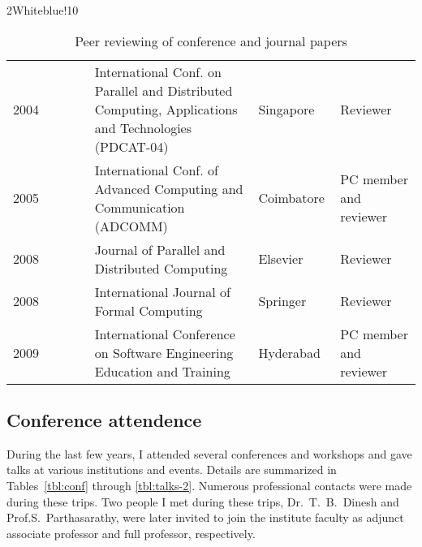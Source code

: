 \documentclass[titlepage, %
11pt, 
]{article}
\begin{document}
\begin{table}
\begin{minipage}{1.0\linewidth}
\rowcolors%
{2}{White}{blue!10}
\setlength\extrarowheight{4pt}
\begin{tabular}%
{|p{0.20\linewidth}|p{0.40\linewidth}|p{0.20\linewidth}|p{0.20\linewidth}|}
\hline
\multicolumn{1}{|m{0.20\linewidth}|}{\centering {\bf Year}}&
\multicolumn{1}{m{0.40\linewidth}|}{\centering {\bf Conference or Journal}}&
\multicolumn{1}{m{0.20\linewidth}|}{\centering {\bf Location or Publisher}}&
\multicolumn{1}{m{0.20\linewidth}|}{\centering {\bf Role}}\\
\hline
2004 & International Conf. on Parallel and Distributed Computing, Applications and Technologies (PDCAT-04) & Singapore & Reviewer\\
2005 & International Conf. of Advanced Computing and Communication (ADCOMM) & Coimbatore & PC member and reviewer\\
2008 & Journal of Parallel and Distributed Computing & Elsevier & Reviewer\\
2008 & International Journal of Formal Computing & Springer & Reviewer\\
2009 & International Conference on Software Engineering Education and Training& Hyderabad & PC member and reviewer\\
\hline
\end{tabular}
\end{minipage}
\caption{Peer reviewing of conference and journal papers\label{tbl:reviewer}}
\end{table}

\subsection{Conference attendence}
\label{subsec:conf-attendence}
During the last few years, I attended several conferences
and workshops and gave talks at various institutions and
events.  Details are summarized in Tables~\ref{tbl:conf}
through \ref{tbl:talks-2}.  Numerous professional contacts
were made during these trips.  Two people I met during these
trips, Dr.~T.~B.~Dinesh and Prof.S.~Parthasarathy, were
later invited to join the institute faculty as adjunct
associate professor and full professor, respectively.
\end{document}
